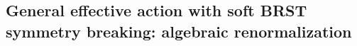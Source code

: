 

\begin{appendix}
\appendix

















\chapter{General effective action with soft BRST symmetry breaking: algebraic renormalization}
\label{ARscalaraction}




\end{appendix}
